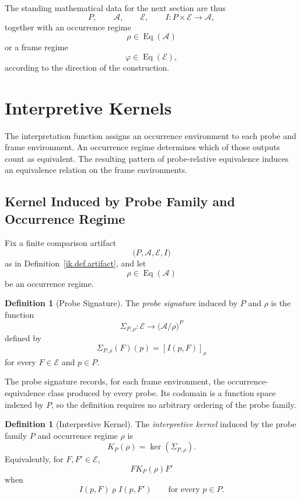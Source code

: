 \documentclass[11pt]{article}
\theoremstyle{plain}
\theoremstyle{definition}
\newtheorem{definition}[theorem]{Definition}
\theoremstyle{remark}
\begin{document}
The standing mathematical data for the next section are thus
\[
  P,
  \qquad
  \mathcal{A},
  \qquad
  \mathcal{E},
  \qquad
  I:P\times\mathcal{E}\longrightarrow\mathcal{A},
\]
together with an occurrence regime
\[
  \rho\in\operatorname{Eq}(\mathcal{A})
\]
or a frame regime
\[
  \varphi\in\operatorname{Eq}(\mathcal{E}),
\]
according to the direction of the construction.


\section{Interpretive Kernels}
\label{ik.sec.kernel}

The interpretation function assigns an occurrence environment
to each probe and frame environment.
An occurrence regime determines which of those outputs count as equivalent.
The resulting pattern of probe-relative equivalence
induces an equivalence relation on the frame environments.

\subsection{Kernel Induced by Probe Family and Occurrence Regime}

Fix a finite comparison artifact
\[
  \bigl(
  P,
  \mathcal{A},
  \mathcal{E},
  I
  \bigr)
\]
as in Definition~\ref{ik.def.artifact},
and let
\[
  \rho\in\operatorname{Eq}(\mathcal{A})
\]
be an occurrence regime.

\begin{definition}[Probe Signature]
  \label{ik.def.probe-signature}
  The \emph{probe signature} induced by \(P\) and \(\rho\) is the function
  \[
    \Sigma_{P,\rho}:
    \mathcal{E}
    \longrightarrow
    \bigl(\mathcal{A}/\rho\bigr)^{P}
  \]
  defined by
  \[
    \Sigma_{P,\rho}(F)(p)
    =
    [I(p,F)]_{\rho}
  \]
  for every \(F\in\mathcal{E}\) and \(p\in P\).
\end{definition}

The probe signature records,
for each frame environment,
the occurrence-equivalence class produced by every probe.
Its codomain is a function space indexed by \(P\),
so the definition requires no arbitrary ordering of the probe family.

\begin{definition}[Interpretive Kernel]
  \label{ik.def.kernel}
  The \emph{interpretive kernel} induced by the probe family \(P\)
  and occurrence regime \(\rho\) is
  \[
    K_P(\rho)
    =
    \ker(\Sigma_{P,\rho}).
  \]
  Equivalently,
  for \(F,F'\in\mathcal{E}\),
  \[
    F\mathrel{K_P(\rho)}F'
  \]
  when
  \[
    I(p,F)\mathrel{\rho}I(p,F')
    \qquad
    \text{for every }p\in P.
  \]
\end{definition}
\end{document}
